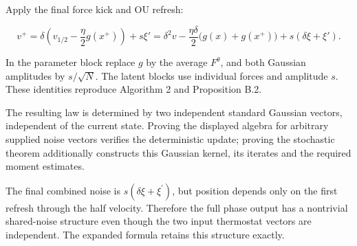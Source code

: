 \documentclass[11pt,a4paper]{report}
\begin{document}
Apply the final force kick and OU refresh:


\[v^+=\delta\left(v_{1/2}-\frac\eta2g(x^+)\right)+s\xi'
=\delta^2v-\frac{\eta\delta}2\bigl(g(x)+g(x^+)\bigr)
+s(\delta\xi+\xi').\]


In the parameter block replace \(g\) by the average \(F^\theta\), and
both Gaussian amplitudes by \(s/\sqrt N\). The latent blocks use individual
forces and amplitude \(s\). These identities reproduce Algorithm 2 and
Proposition B.2.




The resulting law is determined by two independent standard Gaussian
vectors, independent of the current state. Proving the displayed algebra for
arbitrary supplied noise vectors verifies the deterministic update;
proving the stochastic theorem additionally constructs this Gaussian kernel,
its iterates and the required moment estimates.



The final combined noise is \(s(\delta\xi+\xi^{\prime})\), but position depends only on the first refresh through the half velocity. Therefore the full phase output has a nontrivial shared-noise structure even though the two input thermostat vectors are independent. The expanded formula retains this structure exactly.
\end{document}
